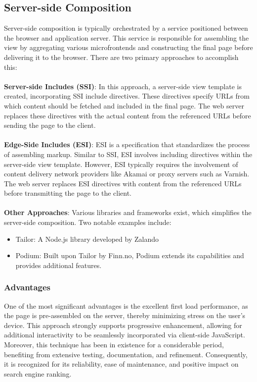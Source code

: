 \subsection{Server-side Composition}
Server-side composition is typically orchestrated by a service positioned between the browser and application server. This service is responsible for assembling the view by aggregating various microfrontends and constructing the final page before delivering it to the browser. There are two primary approaches to accomplish this:\\\\
\textbf{Server-side Includes (SSI)}: 
In this approach, a server-side view template is created, incorporating SSI include directives. These directives specify URLs from which content should be fetched and included in the final page. The web server replaces these directives with the actual content from the referenced URLs before sending the page to the client.\\\\
\textbf{Edge-Side Includes (ESI)}:
ESI is a specification that standardizes the process of assembling markup. Similar to SSI, ESI involves including directives within the server-side view template. However, ESI typically requires the involvement of content delivery network providers like Akamai or proxy servers such as Varnish. The web server replaces ESI directives with content from the referenced URLs before transmitting the page to the client.\\\\
\textbf{Other Approaches}:
Various libraries and frameworks exist, which simplifies the server-side composition. Two notable examples include:
\begin{itemize}
   \item Tailor: A Node.js library developed by Zalando
   \item Podium: Built upon Tailor by Finn.no, Podium extends its capabilities and provides additional features. \cite{MicrofrontendsInAction}
\end{itemize}

\subsubsection{Advantages}
One of the most significant advantages is the excellent first load performance, as the page is pre-assembled on the server, thereby minimizing stress on the user's device. This approach strongly supports progressive enhancement, allowing for additional interactivity to be seamlessly incorporated via client-side JavaScript. Moreover, this technique has been in existence for a considerable period, benefiting from extensive testing, documentation, and refinement. Consequently, it is recognized for its reliability, ease of maintenance, and positive impact on search engine ranking. \cite{MicrofrontendsInAction}

